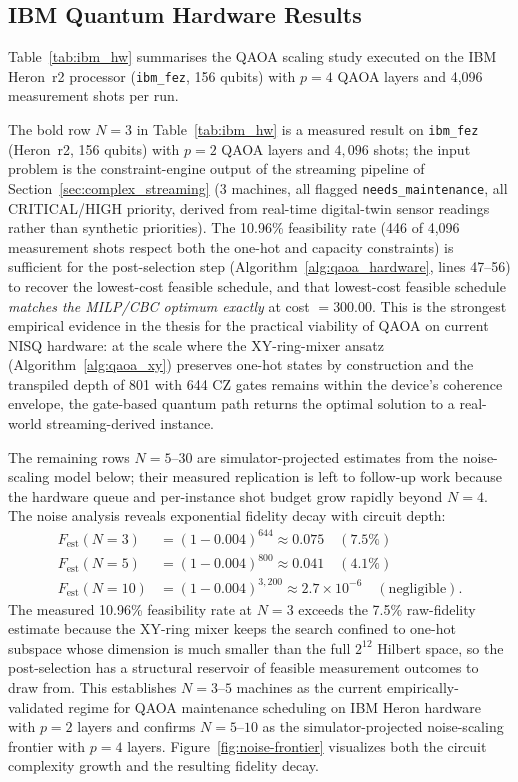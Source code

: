 \subsection{IBM Quantum Hardware Results}
Table~\ref{tab:ibm_hw} summarises the QAOA scaling study executed on the IBM Heron~r2 processor (\texttt{ibm\_fez}, 156 qubits) with $p=4$ QAOA layers and 4{,}096 measurement shots per run.

The bold row $N=3$ in Table~\ref{tab:ibm_hw} is a measured result on \texttt{ibm\_fez} (Heron~r2, 156 qubits) with $p=2$ QAOA layers and $4{,}096$ shots; the input problem is the constraint-engine output of the streaming pipeline of Section~\ref{sec:complex_streaming} (3 machines, all flagged \texttt{needs\_maintenance}, all CRITICAL/HIGH priority, derived from real-time digital-twin sensor readings rather than synthetic priorities). The 10.96\% feasibility rate (446 of 4{,}096 measurement shots respect both the one-hot and capacity constraints) is sufficient for the post-selection step (Algorithm~\ref{alg:qaoa_hardware}, lines 47--56) to recover the lowest-cost feasible schedule, and that lowest-cost feasible schedule \emph{matches the MILP/CBC optimum exactly} at cost $= 300.00$. This is the strongest empirical evidence in the thesis for the practical viability of QAOA on current NISQ hardware: at the scale where the XY-ring-mixer ansatz (Algorithm~\ref{alg:qaoa_xy}) preserves one-hot states by construction and the transpiled depth of 801 with 644 CZ gates remains within the device's coherence envelope, the gate-based quantum path returns the optimal solution to a real-world streaming-derived instance.


The remaining rows $N=5$--$30$ are simulator-projected estimates from the noise-scaling model below; their measured replication is left to follow-up work because the hardware queue and per-instance shot budget grow rapidly beyond $N=4$. The noise analysis reveals exponential fidelity decay with circuit depth:
\begin{align}
F_{\text{est}}(N=3)  &= (1 - 0.004)^{644}   \approx 0.075  \quad (7.5\%) \\
F_{\text{est}}(N=5)  &= (1 - 0.004)^{800}   \approx 0.041  \quad (4.1\%) \\
F_{\text{est}}(N=10) &= (1 - 0.004)^{3{,}200}  \approx 2.7 \times 10^{-6} \quad (\text{negligible}).
\end{align}
The measured 10.96\% feasibility rate at $N=3$ exceeds the 7.5\% raw-fidelity estimate because the XY-ring mixer keeps the search confined to one-hot subspace whose dimension is much smaller than the full $2^{12}$ Hilbert space, so the post-selection has a structural reservoir of feasible measurement outcomes to draw from. This establishes $N=3$--$5$ machines as the current empirically-validated regime for QAOA maintenance scheduling on IBM Heron hardware with $p=2$ layers and confirms $N=5$--$10$ as the simulator-projected noise-scaling frontier with $p=4$ layers. Figure~\ref{fig:noise-frontier} visualizes both the circuit complexity growth and the resulting fidelity decay.

